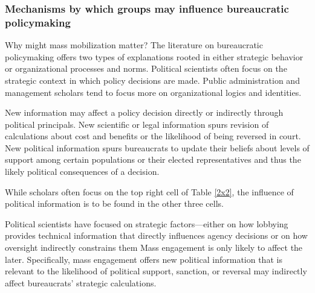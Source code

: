 \subsubsection{Mechanisms by which groups may influence bureaucratic policymaking}


Why might mass mobilization matter? The literature on bureaucratic policymaking offers two types of explanations rooted in either strategic behavior or organizational processes and norms. Political scientists often focus on the strategic context in which policy decisions are made. Public administration and management scholars tend to focus more on organizational logics and identities. 

New information may affect a policy decision directly or indirectly through political principals. New scientific or legal information spurs revision of calculations about cost and benefits or the likelihood of being reversed in court. New political information spurs bureaucrats to update their beliefs about levels of support among certain populations or their elected representatives and thus the likely political consequences of a decision. %

While scholars often focus on the top right cell of Table \ref{2x2}, the influence of political information is to be found in the other three cells. 

Political scientists have focused on strategic factors---either on how lobbying provides technical information that directly influences agency decisions %
or on how oversight indirectly constrains them 
Mass engagement is only likely to affect the later.
Specifically, mass engagement offers new political information that is relevant to the likelihood of political support, sanction, or reversal may indirectly affect bureaucrats' strategic calculations.


